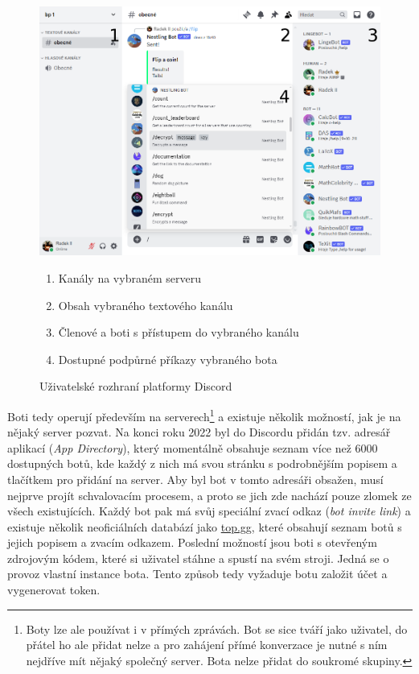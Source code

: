 \documentclass[FM]{tulthesis}
\begin{document}
	\begin{figure}[ht]
		\centering
		\includegraphics[width=\textwidth]{img/DiscordBotCommands}
		\begin{enumerate}[nolistsep]
			\item Kanály na vybraném serveru
			\item Obsah vybraného textového kanálu
			\item Členové a boti s přístupem do vybraného kanálu
			\item Dostupné podpůrné příkazy vybraného bota
		\end{enumerate}
		\caption{Uživatelské rozhraní platformy Discord}		
	\end{figure}
	
	Boti tedy operují především na serverech\footnote{Boty lze ale používat i v přímých zprávách. Bot se sice tváří jako uživatel, do přátel ho ale přidat nelze a pro zahájení přímé konverzace je nutné s ním nejdříve mít nějaký společný server. Bota nelze přidat do soukromé skupiny.} a existuje několik možností, jak je na nějaký server pozvat. Na konci roku 2022 byl do Discordu přidán tzv. adresář aplikací (\textit{App Directory}), který momentálně obsahuje seznam více než 6000 dostupných botů, kde každý z nich má svou stránku s podrobnějším popisem a tlačítkem pro přidání na server. Aby byl bot v tomto adresáři obsažen, musí nejprve projít schvalovacím procesem, a proto se jich zde nachází pouze zlomek ze všech existujících. Každý bot pak má svůj speciální zvací odkaz (\textit{bot invite link}) a existuje několik neoficiálních databází jako \href{https://top.gg}{top.gg}, které obsahují seznam botů s jejich popisem a zvacím odkazem. Poslední možností jsou boti s otevřeným zdrojovým kódem, které si uživatel stáhne a spustí na svém stroji. Jedná se o provoz vlastní instance bota. Tento způsob tedy vyžaduje botu založit účet a vygenerovat token.
	
\end{document}
